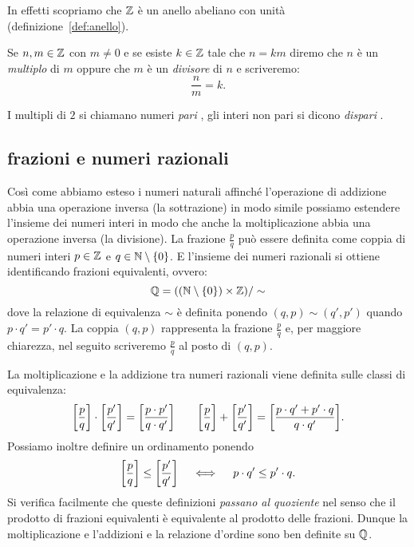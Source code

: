 In effetti scopriamo che ${\mathbb Z}$ è un anello abeliano con unità
(definizione~\ref{def:anello}).

Se $n,m\in{\mathbb Z}$ con $m\neq 0$ e 
%
se esiste $k\in{\mathbb Z}$ tale 
che $n=km$ diremo che $n$ è un \emph{multiplo}
di $m$ oppure che $m$ è un \emph{divisore}%
%
 di $n$
e scriveremo:
\[
  \frac{n}{m} = k.  
\]

I multipli di $2$ si chiamano numeri \emph{pari}%
%
,
gli interi non pari si dicono \emph{dispari}%
%
. 


\subsection{frazioni e numeri razionali}

Così come abbiamo esteso i numeri naturali affinché l'operazione di addizione abbia 
una operazione inversa (la sottrazione) in modo simile possiamo estendere l'insieme 
dei numeri interi in modo che anche la moltiplicazione abbia una operazione inversa 
(la divisione). 
La frazione $\frac p q$ può essere definita come coppia 
di numeri interi $p\in {\mathbb Z}$ e $q\in {\mathbb N}\setminus {\left\{ 0 \right\}}$. 
E l'insieme dei numeri razionali si ottiene identificando 
frazioni equivalenti, ovvero: 
\[
  {\mathbb Q} = (({\mathbb N} \setminus{\left\{ 0 \right\}})\times {\mathbb Z})/\sim  
\]
dove la relazione di equivalenza $\sim$ è definita ponendo 
$(q,p) \sim (q',p')$ quando $p\cdot q' = p'\cdot q$.
La coppia $(q,p)$ rappresenta la frazione $\frac p q$ e, 
per maggiore chiarezza, nel seguito scriveremo $\frac p q$ 
al posto di $(q,p)$.

%
La moltiplicazione e la addizione tra numeri razionali viene definita
sulle classi di equivalenza:
\[
 {\left[ \frac p q \right]} \cdot {\left[ \frac{p'}{q'} \right]} 
 = {\left[ \frac{p\cdot p'}{q\cdot q'} \right]} 
 \qquad 
 {\left[ \frac{p}{q} \right]} + {\left[ \frac{p'}{q'} \right]} 
 = {\left[ \frac{p\cdot q' + p'\cdot q}{q\cdot q'} \right]}.
\]
Possiamo inoltre definire un ordinamento ponendo
\[
 {\left[ \frac p q \right]} \le {\left[ \frac{p'}{q'} \right]}
 \quad\iff  \quad p \cdot q' \le p' \cdot q.
\]
Si verifica facilmente che queste definizioni \emph{passano al quoziente} 
nel senso che il prodotto di frazioni equivalenti è equivalente al prodotto 
delle frazioni. 
Dunque la moltiplicazione e l'addizioni 
e la relazione d'ordine sono ben definite su ${\mathbb Q}$.

